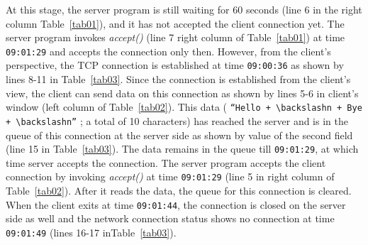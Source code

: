 \begin{multicols}{2}
At this stage, the server program is still waiting for 60 seconds (line 6 in the right column Table~\ref{tab01}), and it has not accepted the client connection yet. The server program invokes \textit{accept()} (line 7 right column of Table~\ref{tab01}) at time \texttt{09:01:29} and accepts the connection only then. However, from the client’s perspective, the TCP connection is established at time \texttt{09:00:36} as shown by lines 8-11 in Table~\ref{tab03}. Since the connection is established from the client’s view, the client can send data on this connection as shown by lines 5-6 in client’s window (left column of Table~\ref{tab02}). This data ( \texttt{“Hello + $\backslash$n + Bye + $\backslash$n”} ; a total of 10 characters) has reached the server and is in the queue of this connection at the server side as shown by value of the second field (line 15 in Table~\ref{tab03}). The data remains in the queue till \texttt{09:01:29}, at which time server accepts the connection. The server program accepts the client connection by invoking \textit{accept()} at time \texttt{09:01:29} (line 5 in right column of Table~\ref{tab02}). After it reads the data, the queue for this connection is cleared. When the client exits at time \texttt{09:01:44}, the connection is closed on the server side as well and the network connection status shows no connection at time \texttt{09:01:49} (lines 16-17 in\break Table~\ref{tab03}).


\end{multicols}

